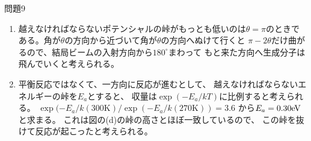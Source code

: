 \documentclass[fleqn]{jbook}
\begin{document}
\begin{answer}{問題9}{}
\begin{enumerate}
\begin{enumerate}
すなわちRydberg 定数の3倍で $-3\times13.6\eV=-40.8\eV$。
\item 越えなければならないポテンシャルの峠がもっとも低いのは$\theta=\pi$のときである。角が$\theta$の方向から近づいて角が$\theta$の方向へぬけて行くと
$\pi-2\theta$だけ曲がるので、結局ビームの入射方向から$180^\circ$まわって
もと来た方向へ生成分子は飛んでいくと考えられる。
\item 平衡反応ではなくて、一方向に反応が進むとして、
越えなければならないエネルギーの峠を$E_a$とすると、
収量は$\exp(-E_a/kT)$に比例すると考えられる。
$\exp(-E_a/k(300\mathrm{K})/\exp(-E_a/k(270\mathrm{K}))=3.6$
から$E_a=0.30\mathrm{eV}$と求まる。
これは図の(d)の峠の高さとほぼ一致しているので、
この峠を抜けて反応が起こったと考えられる。
\end{enumerate}
\end{enumerate}
\end{answer}
\end{document}
